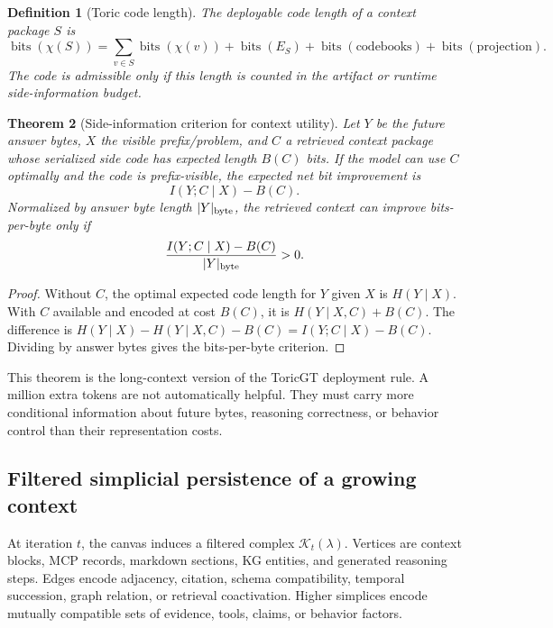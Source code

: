 \documentclass[11pt]{article}
\newtheorem{theorem}{Theorem}[section]
\newtheorem{definition}[theorem]{Definition}
\newcommand{\calK}{\mathcal{K}}
\numberwithin{equation}{section}
\begin{document}
\begin{definition}[Toric code length]
The deployable code length of a context package $S$ is
\begin{equation}
\operatorname{bits}(\chi(S))=\sum_{v\in S}\operatorname{bits}(\chi(v))+\operatorname{bits}(E_S)+\operatorname{bits}(\mathrm{codebooks})+\operatorname{bits}(\mathrm{projection}).
\end{equation}
The code is admissible only if this length is counted in the artifact or runtime side-information budget.
\end{definition}

\begin{theorem}[Side-information criterion for context utility]
Let $Y$ be the future answer bytes, $X$ the visible prefix/problem, and $C$ a retrieved context package whose serialized side code has expected length $B(C)$ bits. If the model can use $C$ optimally and the code is prefix-visible, the expected net bit improvement is
\begin{equation}
I(Y;C\mid X)-B(C).
\end{equation}
Normalized by answer byte length $|Y|_{\rm byte}$, the retrieved context can improve bits-per-byte only if
\begin{equation}
\frac{I(Y;C\mid X)-B(C)}{|Y|_{\rm byte}}>0.
\end{equation}
\end{theorem}
\begin{proof}
Without $C$, the optimal expected code length for $Y$ given $X$ is $H(Y\mid X)$. With $C$ available and encoded at cost $B(C)$, it is $H(Y\mid X,C)+B(C)$. The difference is $H(Y\mid X)-H(Y\mid X,C)-B(C)=I(Y;C\mid X)-B(C)$. Dividing by answer bytes gives the bits-per-byte criterion.
\end{proof}

This theorem is the long-context version of the ToricGT deployment rule. A million extra tokens are not automatically helpful. They must carry more conditional information about future bytes, reasoning correctness, or behavior control than their representation costs.

\subsection{Filtered simplicial persistence of a growing context}
At iteration $t$, the canvas induces a filtered complex $\calK_t(\lambda)$. Vertices are context blocks, MCP records, markdown sections, KG entities, and generated reasoning steps. Edges encode adjacency, citation, schema compatibility, temporal succession, graph relation, or retrieval coactivation. Higher simplices encode mutually compatible sets of evidence, tools, claims, or behavior factors.
\end{document}
